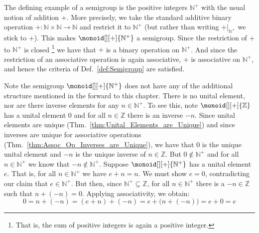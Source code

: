         \begin{example}
            \label{ex:The_Positive_Integers_as_a_Semigroup}%
            The defining example of a semigroup is the positive integers
            $\mathbb{N}^{+}$ with the usual notion of addition $+$. More
            precisely, we take the standard additive binary operation
            $+:\mathbb{N}\times\mathbb{N}\rightarrow\mathbb{N}$ and restrict it
            to $\mathbb{N}^{+}$ (but rather than writing $+|_{\mathbb{N}^{+}}$
            we stick to $+$). This makes $\monoid[][+]{\mathbb{N}^{+}}$ a
            semigroup. Since the restriction of $+$ to $\mathbb{N}^{+}$ is
            closed%
            \footnote{%
                That is, the sum of positive integers is again a positive
                integer.
            }
            we have that $+$ is a binary operation on $\mathbb{N}^{+}$. And
            since the restriction of an associative operation is again
            associative, $+$ is associative on $\mathbb{N}^{+}$, and hence the
            criteria of Def.~\ref{def:Semigroup} are satisfied.
        \end{example}
        Note the semigroup $\monoid[][+]{\mathbb{N}^{+}}$ does not have any of
        the additional structure mentioned in the forward to this chapter. There
        is no unital element, nor are there inverse elements for any
        $n\in\mathbb{N}^{+}$. To see this, note $\monoid[][+]{\mathbb{Z}}$ has a
        unital element 0 and for all $n\in\mathbb{Z}$ there is an inverse
        $\minus{n}$. Since unital elements are unique
        (Thm.~\ref{thm:Unital_Elements_are_Unique}) and since inverses are
        unique for associative operations
        (Thm.~\ref{thm:Assoc_Op_Inverses_are_Unique}), we have that 0 is the
        unique unital element and $\minus{n}$ is the unique inverse of
        $n\in\mathbb{Z}$. But $0\notin\mathbb{N}^{+}$ and for all
        $n\in\mathbb{N}^{+}$ we know that $\minus{n}\notin\mathbb{N}^{+}$.
        Suppose $\monoid[][+]{\mathbb{N}^{+}}$ has a unital element $e$. That
        is, for all $n\in\mathbb{N}^{+}$ we have $e+n=n$. We must show $e=0$,
        contradicting our claim that $e\in\mathbb{N}^{+}$. But then, since
        $\mathbb{N}^{+}\subseteq\mathbb{Z}$, for all $n\in\mathbb{N}^{+}$ there
        is a $\minus{n}\in\mathbb{Z}$ such that $n+(\minus{n})=0$. Applying
        associativity, we obtain:
        \begin{equation}
            0=n+(\minus{n})=(e+n)+(\minus{n})=e+\big(n+(\minus{n})\big)=e+0=e
        \end{equation}
